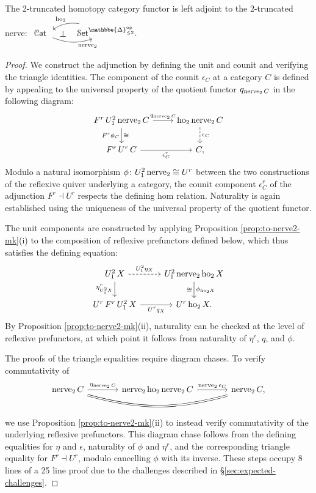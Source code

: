 \documentclass[a4paper,UKenglish,cleveref, autoref, thm-restate]{lipics-v2021}
\newcommand{\op}{\textup{op}}
\newcommand{\ho}{\textup{ho}}
\newcommand{\nerve}{\textup{nerve}}
\newcommand{\cat}[1]{\textup{\textsf{#1}}}%
\newcommand{\1}{\mathbbe{1}}
\newcommand{\2}{\mathbbe{2}}
\newcommand{\3}{\mathbbe{3}}
\newcommand{\DDelta}{\mathbbe{\Delta}}
\newcommand{\Cat}{\mathcal{C}\cat{at}}
\newcommand{\Set}{\mathcal{S}\cat{et}}
\newcommand{\cdocTwo}[3][]{\href{https://leanprover-community.github.io/mathlib4_docs/find/?pattern=CategoryTheory.#1#2\%E2\%82\%82#3\#doc}{\texttt{#2${}_2$#3}}}
\begin{document}
\begin{proposition}[\cdocTwo{nerve}{Adj}]\label{prop:2-truncated-nerve-adj}
The 2-truncated homotopy category functor is left adjoint to the 2-truncated nerve:
$ \begin{tikzcd} \Cat\ \arrow[r, bend right=20, "\nerve_2"' pos=.6] \arrow[r, phantom, "\bot"] & \Set^{\DDelta_{\leq 2}^\op}. \arrow[l, bend right=20, "\ho_2"' pos=.4] \end{tikzcd}$
\end{proposition}
\begin{proof}
We construct the adjunction by defining the unit and counit and verifying the triangle identities. The component of the counit $\epsilon_
C$ at a category $C$ is defined by appealing to the universal property of the quotient functor $q_{\nerve_2\, C}$ in the following diagram:
\[ \begin{tikzcd} F^r\, U^2_1\, \nerve_2\, C \arrow[r, "q_{\nerve_2\, C}"] \arrow[d, "F^r\phi_C"', "\cong"] & \ho_2\, \nerve_2\, C \arrow[d, dashed, "\epsilon_C"] \\ F^r\, U^r\, C \arrow[r, "\epsilon^r_C"'] & C, \end{tikzcd}\]
Modulo a natural isomorphism $\phi \colon U^2_1\,\nerve_2 \cong U^r$ between the two constructions of the reflexive quiver underlying a category, the counit component $\epsilon^r_C$ of the adjunction $F^r \dashv U^r$ respects the defining hom relation. Naturality is again established using the uniqueness of the universal property of the quotient functor.

The unit components are constructed by applying Proposition \ref{prop:to-nerve2-mk}(i) to the composition of reflexive prefunctors defined below, which thus satisfies the defining equation:
\[ \begin{tikzcd} U^2_1\, X \arrow[r, "U^2_1 \eta_X", dashed ] \arrow[d, "\eta^r_{U^2_1X}"'] & U^2_1\, \nerve_2\, \ho_2\, X \arrow[d, "\phi_{\ho_2 X}", "\cong"'] \\ U^r\, F^r\, U^2_1\, X \arrow[r, "U^rq_X"'] & U^r\, \ho_2\, X. \end{tikzcd} \] By Proposition \ref{prop:to-nerve2-mk}(ii), naturality can be checked at the level of reflexive prefunctors, at which point it follows from naturality of $\eta^r$, $q$, and $\phi$.

The proofs of the triangle equalities require diagram chases. To verify commutativity of
\[ \begin{tikzcd}[sep=large] \nerve_2\, C \arrow[r, "\eta_{\nerve_2\,C}"] \arrow[rr, bend right=15, equals] & \nerve_2\,\ho_2\,\nerve_2\, C \arrow[r, "\nerve_2\,\epsilon_C"] & \nerve_2\,C, \end{tikzcd}\]
we use Proposition \ref{prop:to-nerve2-mk}(ii) to instead verify commutativity of the underlying reflexive prefunctors. This diagram chase follows from the defining equalities for $\eta$ and $\epsilon$, naturality of $\phi$ and $\eta^r$, and   the corresponding triangle equality for $F^r \dashv U^r$, modulo cancelling $\phi$ with its inverse.  These steps occupy 8 lines of a 25 line proof due to the challenges described in \S\ref{sec:expected-challenges}.


\end{proof}
\end{document}
